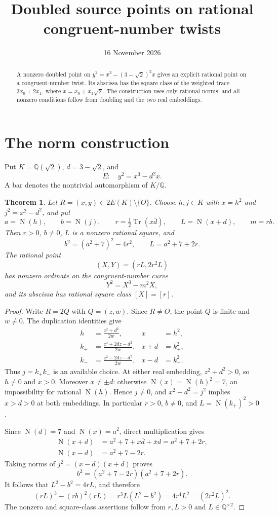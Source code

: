 \documentclass[11pt,a4paper]{article}
\title{Doubled source points on rational congruent-number twists}
\author{}
\date{16 November 2026}
\newtheorem{theorem}{Theorem}[section]
\newcommand{\Q}{\mathbb Q}
\newcommand{\N}{\operatorname N}
\newcommand{\Tr}{\operatorname{Tr}}
\begin{document}
\maketitle
\begin{abstract}
A nonzero doubled point on $y^2=x^3-(3-\sqrt2)^2x$ gives an explicit
rational point on a congruent-number twist. Its abscissa has the square
class of the weighted trace $3x_0+2x_1$, where
$x=x_0+x_1\sqrt2$. The construction uses only rational norms, and all
nonzero conditions follow from doubling and the two real embeddings.
\end{abstract}

\section{The norm construction}

Put $K=\Q(\sqrt2)$, $d=3-\sqrt2$, and
\[
                         E:\quad y^2=x^3-d^2x.
\]
A bar denotes the nontrivial automorphism of $K/\Q$.

\begin{theorem}
Let $R=(x,y)\in2E(K)\setminus\{O\}$. Choose $h,j\in K$ with
$x=h^2$ and $j^2=x^2-d^2$, and put
\[
 a=\N(h),\qquad b=\N(j),\qquad
 r=\tfrac12\Tr(x\bar d),\qquad L=\N(x+d),\qquad m=rb.
\]
Then $r>0$, $b\ne0$, $L$ is a nonzero rational square, and
\[
 b^2=(a^2+7)^2-4r^2,\qquad L=a^2+7+2r.
\]
The rational point
\[
                         (X,Y)=(rL,2r^2L)
\]
has nonzero ordinate on the congruent-number curve
\[
                         Y^2=X^3-m^2X,
\]
and its abscissa has rational square class $[X]=[r]$.
\end{theorem}
\begin{proof}
Write $R=2Q$ with $Q=(z,w)$. Since $R\ne O$, the point $Q$ is finite
and $w\ne0$. The duplication identities give
\begin{align*}
 h&=\frac{z^2+d^2}{2w},&
 x&=h^2,\\
 k_+&=\frac{z^2+2dz-d^2}{2w},&
 x+d&=k_+^2,\\
 k_-&=\frac{z^2-2dz-d^2}{2w},&
 x-d&=k_-^2.
\end{align*}
Thus $j=k_+k_-$ is an available choice. At either real embedding,
$z^2+d^2>0$, so $h\ne0$ and $x>0$. Moreover $x\ne\pm d$: otherwise
$\N(x)=\N(h)^2=7$, an impossibility for rational $\N(h)$.
Hence $j\ne0$, and $x^2-d^2=j^2$ implies $x>d>0$ at both embeddings.
In particular $r>0$, $b\ne0$, and $L=\N(k_+)^2>0$.

Since $\N(d)=7$ and $\N(x)=a^2$, direct multiplication gives
\begin{align*}
 \N(x+d)&=a^2+7+x\bar d+\bar x d=a^2+7+2r,\\
 \N(x-d)&=a^2+7-2r.
\end{align*}
Taking norms of $j^2=(x-d)(x+d)$ proves
\[
             b^2=(a^2+7-2r)(a^2+7+2r).
\]
It follows that $L^2-b^2=4rL$, and therefore
\[
 (rL)^3-(rb)^2(rL)=r^3L(L^2-b^2)=4r^4L^2=(2r^2L)^2.
\]
The nonzero and square-class assertions follow from $r,L>0$ and
$L\in\Q^{\times2}$.
\end{proof}
\end{document}

